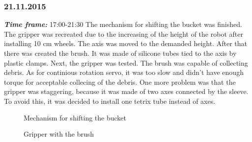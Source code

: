 \subsubsection{21.11.2015}
\textit{\textbf{Time frame:}} 17:00-21:30 \newline
The mechanism for shifting the bucket was finished. 
The gripper was recreated due to the increasing of the height of the robot after installing 10 cm wheels. The axis was moved to the demanded height. After that there was created the brush. It was made of silicone tubes tied to the axis by plastic clamps. Next, the gripper was tested. The brush was capable of collecting debris. As for continious rotation servo, it was too slow and didn't have enough torque for acceptable collecing of the debris. One more problem was that the gripper was staggering, because it was made of two axes connected by the sleeve. To avoid this, it was decided to install one tetrix tube instead of axes.

\begin{figure}[H]
	\begin{minipage}[h]{0.47\linewidth}
		\caption{Mechanism for shifting the bucket}
	\end{minipage}
	\hfill
	\begin{minipage}[h]{0.47\linewidth}
		\caption{Gripper with the brush}
	\end{minipage}
\end{figure}
